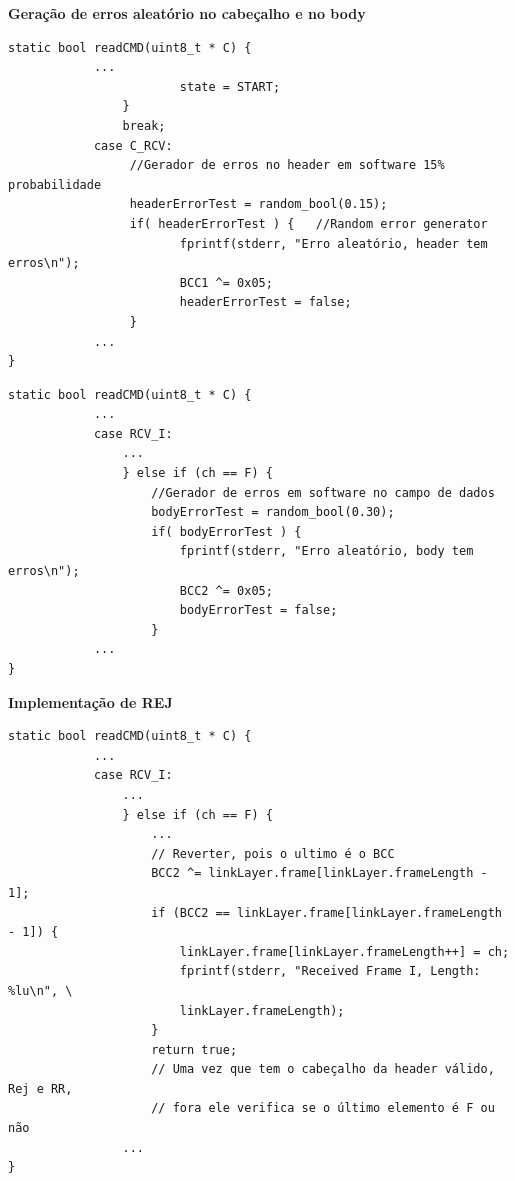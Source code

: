 \documentclass[a4paper]{article}
\begin{document}
\noindent\textbf{Geração de erros aleatório no cabeçalho e no body}
\begin{verbatim}
static bool readCMD(uint8_t * C) {
            ...
                        state = START;
                }
                break;
            case C_RCV:
                 //Gerador de erros no header em software 15% probabilidade
                 headerErrorTest = random_bool(0.15);
                 if( headerErrorTest ) {   //Random error generator
                        fprintf(stderr, "Erro aleatório, header tem erros\n");
                        BCC1 ^= 0x05;
                        headerErrorTest = false;
                 }
            ...
}
\end{verbatim}

\begin{verbatim}
static bool readCMD(uint8_t * C) {
            ...
            case RCV_I:
                ...
                } else if (ch == F) {
                    //Gerador de erros em software no campo de dados
                    bodyErrorTest = random_bool(0.30);
                    if( bodyErrorTest ) {
                        fprintf(stderr, "Erro aleatório, body tem erros\n");
                        BCC2 ^= 0x05;
                        bodyErrorTest = false;
                    }
            ...
}
\end{verbatim}
\noindent\textbf{Implementação de REJ}
\begin{verbatim}
static bool readCMD(uint8_t * C) {
            ...
            case RCV_I:
                ...
                } else if (ch == F) {
                    ...
                    // Reverter, pois o ultimo é o BCC
                    BCC2 ^= linkLayer.frame[linkLayer.frameLength - 1];
                    if (BCC2 == linkLayer.frame[linkLayer.frameLength - 1]) {
                        linkLayer.frame[linkLayer.frameLength++] = ch;
                        fprintf(stderr, "Received Frame I, Length: %lu\n", \
                        linkLayer.frameLength);
                    }
                    return true;
                    // Uma vez que tem o cabeçalho da header válido, Rej e RR,
                    // fora ele verifica se o último elemento é F ou não
                ...
}
\end{verbatim}
\end{document}
